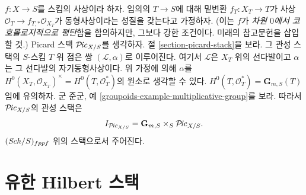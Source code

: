 \begin{example}
\label{example-inertia-stack-of-picard}
$f : X \to S$를 스킴의 사상이라 하자. 임의의 $T \to S$에 대해 밑변환
$f_T : X_T \to T$가 사상 $\mathcal{O}_T \to f_{T, *}\mathcal{O}_{X_T}$가
동형사상이라는 성질을 갖는다고 가정하자. (이는 $f$가
\textit{차원 $0$에서 코호몰로지적으로 평탄}함을 함의하지만, 그보다 강한
조건이다. 미래의 참고문헌을 삽입할 것.) Picard 스택
$\mathcal{P}\!\mathit{ic}_{X/S}$를 생각하자. 절 \ref{section-picard-stack}을 보라.
그 관성 스택의 $S$-스킴 $T$ 위 점은 쌍 $(\mathcal{L}, \alpha)$로 이루어진다.
여기서 $\mathcal{L}$은 $X_T$ 위의 선다발이고 $\alpha$는 그 선다발의
자기동형사상이다. 위 가정에 의해 $\alpha$를
$H^0(X_T, \mathcal{O}_{X_T})^\times = H^0(T, \mathcal{O}_T^*)$의 원소로
생각할 수 있다. $H^0(T, \mathcal{O}_T^*) = \mathbf{G}_{m, S}(T)$임에
유의하자. 군 준군, 예 \ref{groupoids-example-multiplicative-group}를 보라.
따라서 $\mathcal{P}\!\mathit{ic}_{X/S}$의 관성 스택은
$$
I_{\mathcal{P}\!\mathit{ic}_{X/S}} = \mathbf{G}_{m, S} \times_S \mathcal{P}\!\mathit{ic}_{X/S}.
$$
$(\mathit{Sch}/S)_{fppf}$ 위의 스택으로서 주어진다.
\end{example}






\section{유한 Hilbert 스택}
\label{section-hilbert-d-stack}

